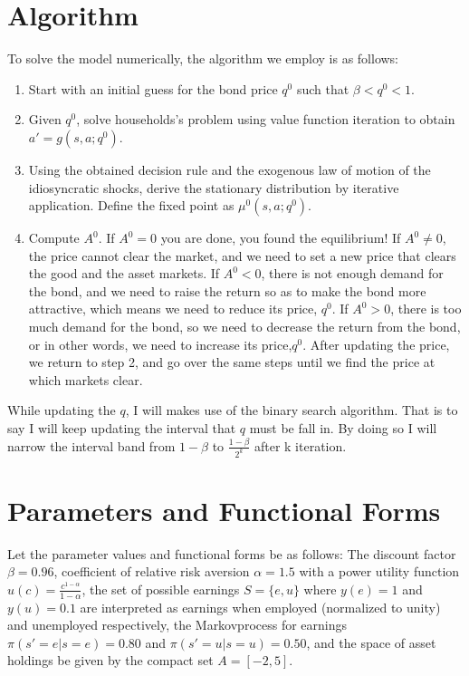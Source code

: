 \documentclass[a4paper,10pt,12pt]{article}%
\begin{document}
\section*{Algorithm}
To solve the model numerically, the algorithm we employ is as follows:
\begin{enumerate}
\item Start with an initial guess for the bond price $q^0$ such that $\beta < q^0 < 1$.
\item Given $q^0$, solve households's problem using value function iteration to obtain $a'=g(s,a;q^0)$.
\item Using the obtained decision rule and the exogenous law of motion of the idiosyncratic shocks, derive the stationary distribution by iterative application. Define the fixed point as $\mu^0(s,a;q^0)$.
\item Compute $A^0$. If $A^0=0$ you are done, you found the equilibrium! If $A^0 \neq 0$, the price cannot clear the market, and we need to set a new price that clears the good and the asset markets. If $A^0<0$, there is not enough demand for the bond, and we need to raise the return so as to make the bond more attractive, which means we need to reduce its price, $q^0$. If $A^0>0$, there is too much demand for the bond, so we need to decrease the return from the bond, or in other words, we need to increase its price,$q^0$. After updating the price, we return to step 2, and go over the same steps until we find the price at which markets clear.
\end{enumerate}
While updating the $q$, I will makes use of the binary search algorithm. That is to say I will keep updating the interval that $q$ must be fall in. By doing so I will narrow the interval band from $1-\beta$ to $ \frac{1-\beta}{2^k}$ after k iteration. 

\section*{Parameters and Functional Forms}
Let the parameter values and functional forms be as follows: The discount factor $\beta=0.96$, coefficient of relative risk aversion $\alpha=1.5$ with a power utility function $u(c)=\frac{c^{1-\alpha}}{1-\alpha}$, the set of possible earnings $S=\{e,u\}$ where $y(e) = 1$ and $y(u) = 0.1$ are interpreted as earnings when employed (normalized to unity) and unemployed respectively, the Markovprocess for earnings $\pi(s'=e|s=e)=0.80$ and $\pi(s'=u|s=u)=0.50$, and the space of asset holdings be given by the compact set $A=[-2,5]$.
\end{document}
